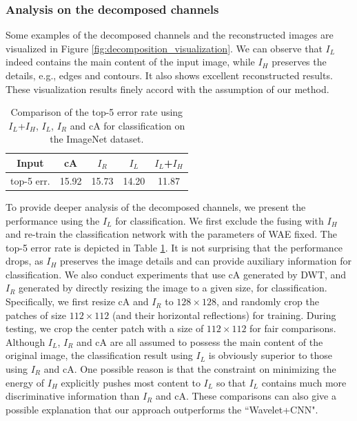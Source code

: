 \documentclass[letterpaper]{article} %
\begin{document}
\subsubsection{Analysis on the decomposed channels}
Some examples of the decomposed channels and the reconstructed images are visualized in Figure \ref{fig:decomposition_visualization}. We can observe that $I_L$ indeed contains the main content of the input image, while $I_H$ preserves the details, e.g., edges and contours. It also shows excellent reconstructed results. These visualization results finely accord with the assumption of our method. 

\begin{table}[htbp]
\centering
\begin{tabular}{c|c|c|c|c}
\hline
\centering  Input  & cA & $I_R$ & $I_L$    & $I_L$+$I_H$ \\
\hline
\hline
\centering top-5 err.  & 15.92 & 15.73  & 14.20 & 11.87 \\
\hline
\end{tabular}
\caption{Comparison of the top-5 error rate using $I_L$+$I_H$, $I_L$, $I_R$ and cA for classification on the ImageNet dataset.}
\label{table:I_L}
\end{table}

To provide deeper analysis of the decomposed channels, we present the performance using the $I_L$ for classification. We first exclude the fusing with $I_H$ and re-train the classification network with the parameters of WAE fixed. The top-5 error rate is depicted in Table \ref{table:I_L}. It is not surprising that the performance drops, as $I_H$ preserves the image details and can provide auxiliary information for classification. We also conduct experiments that use cA generated by DWT, and $I_R$ generated by directly resizing the image to a given size, for classification. Specifically, we first resize cA and $I_R$ to $128 \times 128$, and randomly crop the patches of size $112 \times 112$ (and their horizontal reflections) for training. During testing, we crop the center patch with a size of $112 \times 112$ for fair comparisons. Although $I_L$, $I_R$ and cA are all assumed to possess the main content of the original image, the classification result using $I_L$ is obviously superior to those using $I_R$ and cA. One possible reason is that the constraint on minimizing the energy of $I_H$ explicitly pushes most content to $I_L$ so that $I_L$ contains much more discriminative information than $I_R$ and cA. These comparisons can also give a possible explanation that our approach outperforms the ``Wavelet+CNN". 
\end{document}
